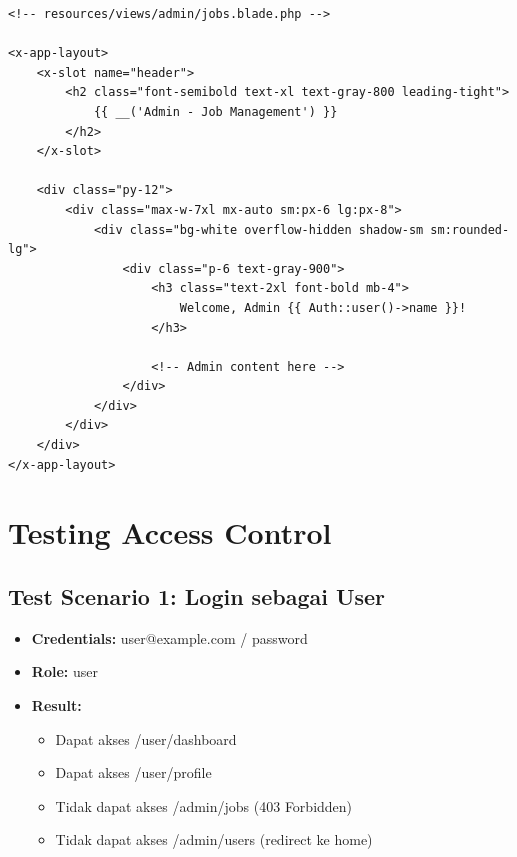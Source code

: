 \documentclass[a4paper,oneside,11pt]{book}
\begin{document}
\begin{lstlisting}[style=phpstyle]
<!-- resources/views/admin/jobs.blade.php -->

<x-app-layout>
    <x-slot name="header">
        <h2 class="font-semibold text-xl text-gray-800 leading-tight">
            {{ __('Admin - Job Management') }}
        </h2>
    </x-slot>

    <div class="py-12">
        <div class="max-w-7xl mx-auto sm:px-6 lg:px-8">
            <div class="bg-white overflow-hidden shadow-sm sm:rounded-lg">
                <div class="p-6 text-gray-900">
                    <h3 class="text-2xl font-bold mb-4">
                        Welcome, Admin {{ Auth::user()->name }}!
                    </h3>
                    
                    <!-- Admin content here -->
                </div>
            </div>
        </div>
    </div>
</x-app-layout>
\end{lstlisting}

\section{Testing Access Control}

\subsection{Test Scenario 1: Login sebagai User}
\begin{itemize}
    \item \textbf{Credentials:} user@example.com / password
    \item \textbf{Role:} user
    \item \textbf{Result:}
    \begin{itemize}
        \item [\checkmark] Dapat akses /user/dashboard
        \item [\checkmark] Dapat akses /user/profile
        \item [$\times$] Tidak dapat akses /admin/jobs (403 Forbidden)
        \item [$\times$] Tidak dapat akses /admin/users (redirect ke home)
    \end{itemize}
\end{itemize}
\end{document}
